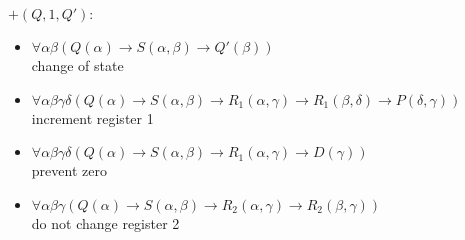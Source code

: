 $+(Q,1,Q'):$
\begin{itemize}
\item $\forall\alpha\beta(Q(\alpha)\to S(\alpha,\beta)\to Q'(\beta))$ \\change of state
\item $\forall\alpha\beta\gamma\delta(Q(\alpha)\to S(\alpha,\beta)\to R_1(\alpha,\gamma)\to R_1(\beta,\delta)\to P(\delta,\gamma))$\\increment register 1
\item $\forall\alpha\beta\gamma\delta(Q(\alpha)\to S(\alpha,\beta)\to R_1(\alpha,\gamma)\to D(\gamma))$ \\prevent zero %
\item $\forall\alpha\beta\gamma(Q(\alpha)\to S(\alpha,\beta)\to R_2(\alpha,\gamma)\to R_2(\beta,\gamma))$ \\do not change register 2
\end{itemize}

